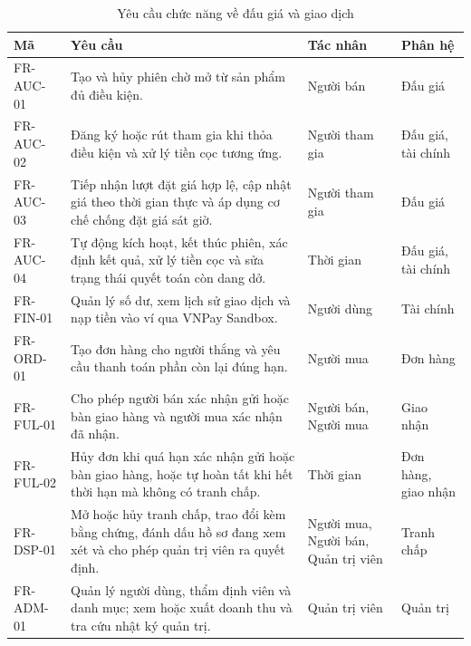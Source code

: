 \documentclass[../DoAn.tex]{subfiles}
\begin{document}
\begin{table}[H]
    \centering
    \caption{Yêu cầu chức năng về đấu giá và giao dịch}
    \label{tab:functional-requirements-transaction}
    \scriptsize
    \setlength{\tabcolsep}{3pt}
    \renewcommand{\arraystretch}{1.02}
    \begin{tabular}{|>{\raggedright\arraybackslash}p{}|>{\raggedright\arraybackslash}p{}|>{\raggedright\arraybackslash}p{}|>{\raggedright\arraybackslash}p{}|}
        \hline
        \textbf{Mã} & \textbf{Yêu cầu} & \textbf{Tác nhân} & \textbf{Phân hệ} \\
        \hline
        FR-AUC-01 & Tạo và hủy phiên chờ mở từ sản phẩm đủ điều kiện. & Người bán & Đấu giá \\
        \hline
        FR-AUC-02 & Đăng ký hoặc rút tham gia khi thỏa điều kiện và xử lý tiền cọc tương ứng. & Người tham gia & Đấu giá, tài chính \\
        \hline
        FR-AUC-03 & Tiếp nhận lượt đặt giá hợp lệ, cập nhật giá theo thời gian thực và áp dụng cơ chế chống đặt giá sát giờ. & Người tham gia & Đấu giá \\
        \hline
        FR-AUC-04 & Tự động kích hoạt, kết thúc phiên, xác định kết quả, xử lý tiền cọc và sửa trạng thái quyết toán còn dang dở. & Thời gian & Đấu giá, tài chính \\
        \hline
        FR-FIN-01 & Quản lý số dư, xem lịch sử giao dịch và nạp tiền vào ví qua VNPay Sandbox. & Người dùng & Tài chính \\
        \hline
        FR-ORD-01 & Tạo đơn hàng cho người thắng và yêu cầu thanh toán phần còn lại đúng hạn. & Người mua & Đơn hàng \\
        \hline
        FR-FUL-01 & Cho phép người bán xác nhận gửi hoặc bàn giao hàng và người mua xác nhận đã nhận. & Người bán, Người mua & Giao nhận \\
        \hline
        FR-FUL-02 & Hủy đơn khi quá hạn xác nhận gửi hoặc bàn giao hàng, hoặc tự hoàn tất khi hết thời hạn mà không có tranh chấp. & Thời gian & Đơn hàng, giao nhận \\
        \hline
        FR-DSP-01 & Mở hoặc hủy tranh chấp, trao đổi kèm bằng chứng, đánh dấu hồ sơ đang xem xét và cho phép quản trị viên ra quyết định. & Người mua, Người bán, Quản trị viên & Tranh chấp \\
        \hline
        FR-ADM-01 & Quản lý người dùng, thẩm định viên và danh mục; xem hoặc xuất doanh thu và tra cứu nhật ký quản trị. & Quản trị viên & Quản trị \\
        \hline
    \end{tabular}
\end{table}
\end{document}
